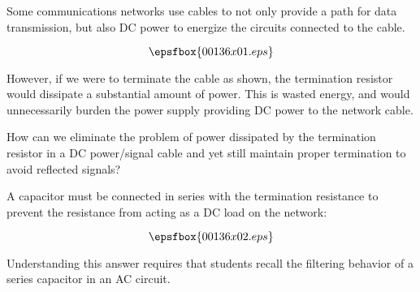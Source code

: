 

Some communications networks use cables to not only provide a path for data transmission, but also DC power to energize the circuits connected to the cable.

$$\epsfbox{00136x01.eps}$$

However, if we were to terminate the cable as shown, the termination resistor would dissipate a substantial amount of power.  This is wasted energy, and would unnecessarily burden the power supply providing DC power to the network cable.

How can we eliminate the problem of power dissipated by the termination resistor in a DC power/signal cable and yet still maintain proper termination to avoid reflected signals?







A capacitor must be connected in series with the termination resistance to prevent the resistance from acting as a DC load on the network:

$$\epsfbox{00136x02.eps}$$







Understanding this answer requires that students recall the filtering behavior of a series capacitor in an AC circuit.




